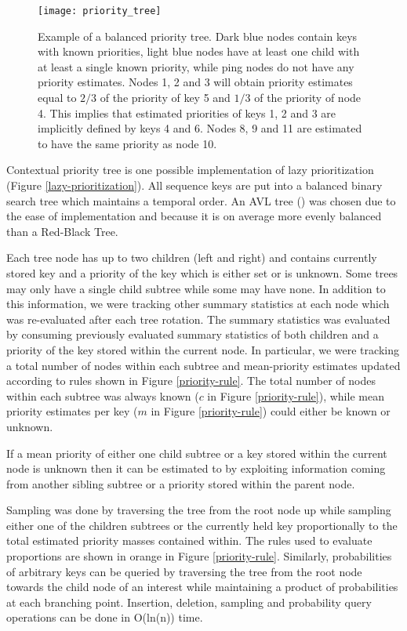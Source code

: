 \documentclass{article}
\begin{document}
\begin{figure}
\centering
\begin{minipage}{1.0\textwidth}  
  \centering
  \texttt{[image: priority\_tree]}
  \caption{Example of a balanced priority tree. Dark blue nodes contain keys 
    with known priorities, light blue nodes have at least one child with at 
    least a single known priority, while ping nodes do not have any priority 
    estimates. Nodes 1, 2 and 3 will obtain priority estimates equal to $2/3$ 
    of the priority of key 5 and $1/3$ of the priority of node 4. This implies 
    that estimated priorities of keys 1, 2 and 3 are implicitly defined by keys 
    4 and 6. Nodes 8, 9 and 11 are estimated to have the same priority as node 
    10.}
  \label{priority-tree}
\end{minipage}\end{figure}

Contextual priority tree is one possible implementation of lazy 
prioritization (Figure \ref{lazy-prioritization}). All sequence 
keys are put into a balanced binary search tree which maintains a temporal 
order. An AVL tree (\cite{velskii1976avl}) was chosen due to the ease of 
implementation and because it is on average more evenly balanced than a 
Red-Black Tree.

Each tree node has up to two children (left and right) and contains currently 
stored key 
and a priority of the key which is either set or is unknown. Some trees may 
only 
have a single child subtree while some may have none. In addition to this 
information, we were tracking other summary statistics at each node which was 
re-evaluated after each tree rotation. The summary statistics was evaluated by 
consuming previously evaluated summary statistics of both children and a 
priority of the key stored within the current node. In particular, we were 
tracking a total number of nodes within each subtree and mean-priority 
estimates 
updated according to rules shown in Figure \ref{priority-rule}. The total 
number of 
nodes within each subtree was always known ($c$ in Figure \ref{priority-rule}), 
while mean priority estimates per key ($m$ in Figure \ref{priority-rule}) could 
either be known or unknown. 

If a mean priority of either one child subtree or a key 
stored within the current node is unknown then it can be estimated to by 
exploiting information coming from another sibling subtree or a priority 
stored within the parent node.

Sampling was done by traversing the tree from the root node up while sampling 
either one of the children subtrees or the currently held key proportionally to 
the total estimated priority masses contained within. The rules used to 
evaluate proportions are shown in orange in Figure 
\ref{priority-rule}. Similarly, probabilities of arbitrary keys can be queried 
by traversing the tree from the root node towards the child node of an interest 
while maintaining a product of probabilities at each branching point. 
Insertion, 
deletion, sampling and probability query operations can be done in O(ln(n)) 
time.
\end{document}
